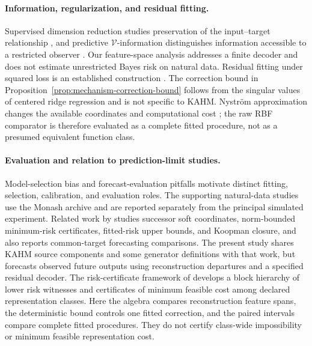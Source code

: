 \paragraph{Information, regularization, and residual fitting.}
Supervised dimension reduction studies preservation of the input--target
relationship \citep{Fukumizu2004SDR}, and predictive
$\mathcal V$-information distinguishes information accessible to a
restricted observer \citep{Xu2020Usable}. Our feature-space analysis
addresses a finite decoder and does not estimate unrestricted Bayes
risk on natural data. Residual fitting under squared loss is an
established construction \citep{Buhlmann2003L2}. The correction bound
in Proposition~\ref{prop:mechanism-correction-bound} follows from the
singular values of centered ridge regression and is not specific to
KAHM. Nystr\"om approximation changes the available coordinates and
computational cost \citep{Williams2001Nystrom,Rudi2015Nystrom}; the raw
RBF comparator is therefore evaluated as a complete fitted procedure,
not as a presumed equivalent function class.

\paragraph{Evaluation and relation to prediction-limit studies.}
Model-selection bias \citep{Cawley2010Selection} and forecast-evaluation
pitfalls \citep{Hewamalage2023Evaluation} motivate distinct fitting,
selection, calibration, and evaluation roles. The supporting natural-data
studies use the Monash archive \citep{Godahewa2021Monash} and are reported
separately from the principal simulated experiment. Related work by
\citet{KumarKargaran2026Limits} studies successor soft coordinates,
norm-bounded minimum-risk certificates, fitted-risk upper bounds, and
Koopman closure, and also reports common-target forecasting comparisons.
The present study shares KAHM source components and some generator
definitions with that work, but forecasts observed future outputs using
reconstruction departures and a specified residual decoder.
The risk-certificate framework of \citet{KumarKargaran2026RiskCertificates}
develops a block hierarchy of lower risk witnesses and certificates of
minimum feasible cost among declared representation classes. Here the
algebra compares reconstruction feature spans, the deterministic bound
controls one fitted correction, and the paired intervals compare complete
fitted procedures. They do not certify class-wide impossibility or
minimum feasible representation cost.
